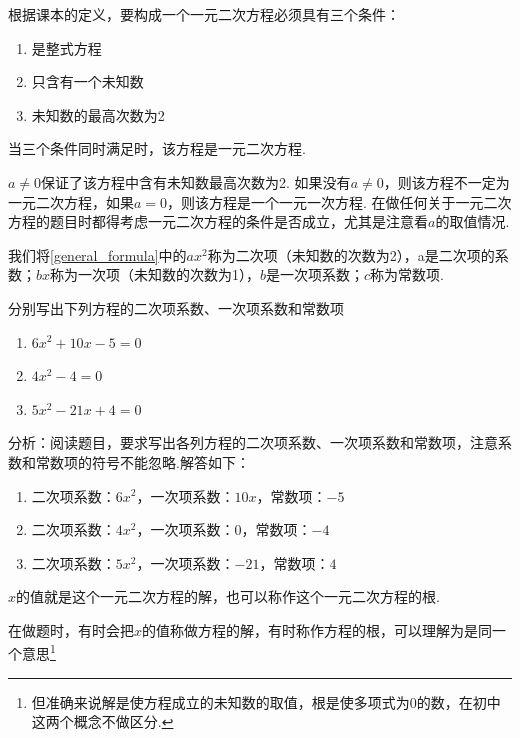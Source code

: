 \documentclass[lang=cn, 10pt, titlestyle=hang, oneside]{elegantbook}
\begin{document}
根据课本的定义，要构成一个一元二次方程必须具有三个条件：
\begin{enumerate}
    \item 是整式方程
    \item 只含有一个未知数
    \item 未知数的最高次数为2
\end{enumerate}
\par
当三个条件同时满足时，该方程是一元二次方程.\\
\begin{remark}
    \(a\ne 0\)保证了该方程中含有未知数最高次数为2. 如果没有\(a\ne 0\)，则该方程不一定为一元二次方程，如果\(a= 0\)，则该方程是一个一元一次方程. 在做任何关于一元二次方程的题目时都得考虑一元二次方程的条件是否成立，尤其是注意看\(a\)的取值情况.
\end{remark}
\par
我们将\eqref{general_formula}中的$ax^2$称为二次项（未知数的次数为2），a是二次项的系数；$bx$称为一次项（未知数的次数为1），$b$是一次项系数；$c$称为常数项.
\par
\begin{example}
    分别写出下列方程的二次项系数、一次项系数和常数项
    \begin{enumerate}
        \item \( 6x^2+10x-5=0 \)
        \item \( 4x^2-4=0 \)
        \item \( 5x^2-21x+4=0 \)
    \end{enumerate}
\end{example}
\par
\begin{solution}
    分析：阅读题目，要求写出各列方程的二次项系数、一次项系数和常数项，注意系数和常数项的符号不能忽略.解答如下：
    \begin{enumerate}
        \item  二次项系数：\(6x^2\)，一次项系数：\(10x\)，常数项：\(-5\)
        \item  二次项系数：\(4x^2\)，一次项系数：\(0\)，常数项：\(-4\)
        \item  二次项系数：\(5x^2\)，一次项系数：\(-21\)，常数项：\(4\)
    \end{enumerate}
\end{solution}
$x$的值就是这个一元二次方程的解，也可以称作这个一元二次方程的根.
\begin{remark}
    在做题时，有时会把$x$的值称做方程的解，有时称作方程的根，可以理解为是同一个意思\footnote{但准确来说解是使方程成立的未知数的取值，根是使多项式为0的数，在初中这两个概念不做区分.}
\end{remark}
\end{document}
